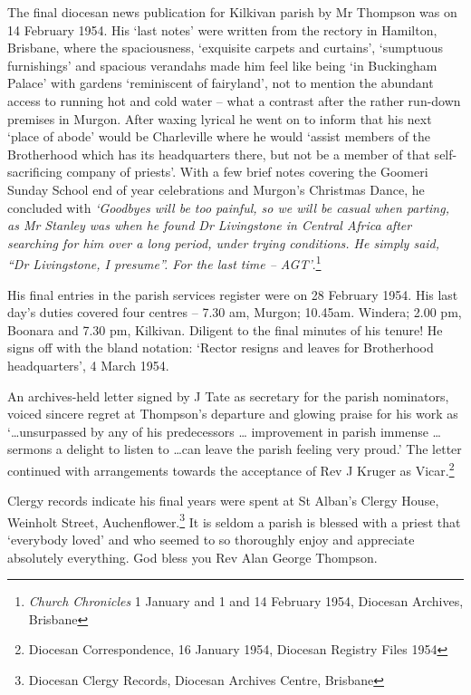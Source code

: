 The final diocesan news publication for Kilkivan parish by Mr Thompson was on 14 February 1954. His `last notes' were written from the rectory in Hamilton, Brisbane, where the spaciousness, `exquisite carpets and curtains', `sumptuous furnishings' and spacious verandahs made him feel like being `in Buckingham Palace' with gardens `reminiscent of fairyland', not to mention the abundant access to running hot and cold water -- what a contrast after the rather run-down premises in Murgon. After waxing lyrical he went on to inform that his next `place of abode' would be Charleville where he would `assist members of the Brotherhood which has its headquarters there, but not be a member of that self-sacrificing company of priests'. With a few brief notes covering the Goomeri Sunday School end of year celebrations and Murgon's Christmas Dance, he concluded with \emph{`Goodbyes will be too painful, so we will be casual when parting, as Mr Stanley was when he found Dr Livingstone in Central Africa after searching for him over a long period, under trying conditions. He simply said, ``Dr Livingstone, I presume''. For the last time -- AGT'}.\footnote{\emph{Church Chronicles} 1 January and 1 and 14 February 1954, Diocesan Archives, Brisbane}

His final entries in the parish services register were on 28 February 1954. His last day's duties covered four centres -- 7.30 am, Murgon; 10.45am. Windera; 2.00 pm, Boonara and 7.30 pm, Kilkivan. Diligent to the final minutes of his tenure! He signs off with the bland notation: `Rector resigns and leaves for Brotherhood headquarters', 4 March 1954.

An archives-held letter signed by J Tate as secretary for the parish nominators, voiced sincere regret at Thompson's departure and glowing praise for his work as `\ldots unsurpassed by any of his predecessors \ldots{} improvement in parish immense \ldots{} sermons a delight to listen to \ldots can leave the parish feeling very proud.' The letter continued with arrangements towards the acceptance of Rev J Kruger as Vicar.\footnote{Diocesan Correspondence, 16 January 1954, Diocesan Registry Files 1954}

Clergy records indicate his final years were spent at St Alban's Clergy House, Weinholt Street, Auchenflower.\footnote{Diocesan Clergy Records, Diocesan Archives Centre, Brisbane} It is seldom a parish is blessed with a priest that `everybody loved' and who seemed to so thoroughly enjoy and appreciate absolutely everything. God bless you Rev Alan George Thompson.

